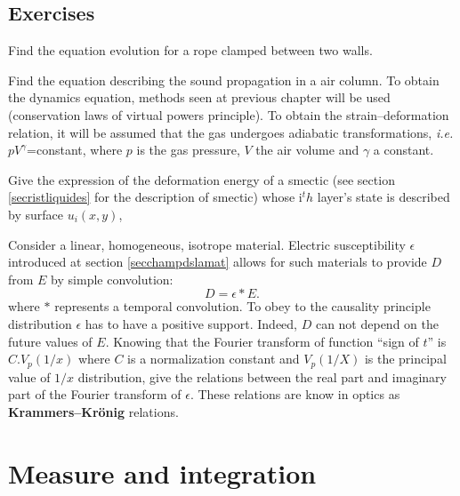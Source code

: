 \documentclass[12pt]{book}
\begin{document}
\section{Exercises}

\begin{exo}
Find the equation evolution for a rope clamped between two walls.
\end{exo}

\begin{exo}
Find the equation describing the sound propagation in a air column. To obtain
the dynamics equation, methods seen at previous chapter will be used
(conservation laws of virtual powers principle). To obtain the
strain--deformation relation, it will be assumed that the gas undergoes
adiabatic transformations, {\it i.e.}
$pV^{\gamma}$=constant, where $p$ is the gas pressure, $V$ the air volume and
$\gamma$ a constant.
\end{exo}

\begin{exo}
Give the expression of the deformation energy of a smectic (see section
\ref{secristliquides} for the description of smectic) whose
i$^th$ layer's state is described by surface $u_i(x,y)$,
\end{exo}

\begin{exo}
Consider a linear, homogeneous, isotrope material. Electric susceptibility
$\epsilon$ introduced at section \ref{secchampdslamat} allows for such
materials to provide $D$ from $E$ by simple convolution:
\begin{equation}\label{eqexsusc}
D=\epsilon * E.
\end{equation}
where $*$ represents a temporal convolution. To obey to the causality
principle distribution $\epsilon$ has to have a positive support. Indeed, $D$
can not depend on the future values of $E$. Knowing that the Fourier
transform of function ``sign of $t$'' is $C.V_p(1/x)$ where $C$ is a
normalization constant and $V_p(1/X)$ is the principal value of $1/x$
distribution, give the relations between the real part and imaginary part of
the Fourier transform of $\epsilon$.  These relations are know in optics as
{\bf Krammers--Kr\"onig} relations.
\end{exo}

\appendix




\chapter{Measure and integration}
\end{document}
